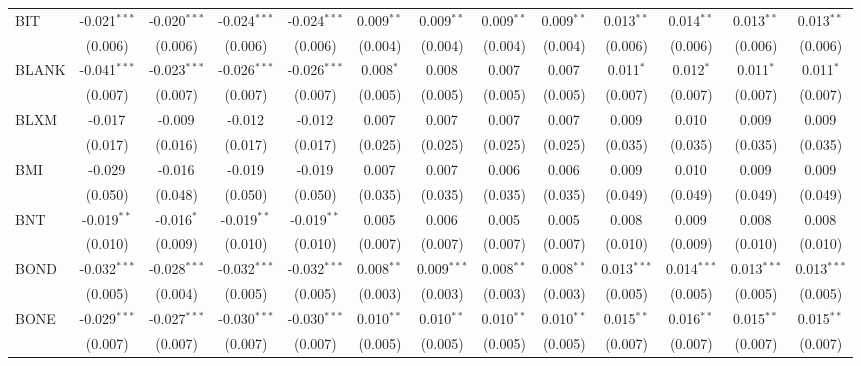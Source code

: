 \begin{table}[!htbp]
\begin{tabular}{@{\extracolsep{5pt}}lcccccccccccc}
 BIT & -0.021$^{***}$ & -0.020$^{***}$ & -0.024$^{***}$ & -0.024$^{***}$ & 0.009$^{**}$ & 0.009$^{**}$ & 0.009$^{**}$ & 0.009$^{**}$ & 0.013$^{**}$ & 0.014$^{**}$ & 0.013$^{**}$ & 0.013$^{**}$ \\
  & (0.006) & (0.006) & (0.006) & (0.006) & (0.004) & (0.004) & (0.004) & (0.004) & (0.006) & (0.006) & (0.006) & (0.006) \\
 BLANK & -0.041$^{***}$ & -0.023$^{***}$ & -0.026$^{***}$ & -0.026$^{***}$ & 0.008$^{*}$ & 0.008$^{}$ & 0.007$^{}$ & 0.007$^{}$ & 0.011$^{*}$ & 0.012$^{*}$ & 0.011$^{*}$ & 0.011$^{*}$ \\
  & (0.007) & (0.007) & (0.007) & (0.007) & (0.005) & (0.005) & (0.005) & (0.005) & (0.007) & (0.007) & (0.007) & (0.007) \\
 BLXM & -0.017$^{}$ & -0.009$^{}$ & -0.012$^{}$ & -0.012$^{}$ & 0.007$^{}$ & 0.007$^{}$ & 0.007$^{}$ & 0.007$^{}$ & 0.009$^{}$ & 0.010$^{}$ & 0.009$^{}$ & 0.009$^{}$ \\
  & (0.017) & (0.016) & (0.017) & (0.017) & (0.025) & (0.025) & (0.025) & (0.025) & (0.035) & (0.035) & (0.035) & (0.035) \\
 BMI & -0.029$^{}$ & -0.016$^{}$ & -0.019$^{}$ & -0.019$^{}$ & 0.007$^{}$ & 0.007$^{}$ & 0.006$^{}$ & 0.006$^{}$ & 0.009$^{}$ & 0.010$^{}$ & 0.009$^{}$ & 0.009$^{}$ \\
  & (0.050) & (0.048) & (0.050) & (0.050) & (0.035) & (0.035) & (0.035) & (0.035) & (0.049) & (0.049) & (0.049) & (0.049) \\
 BNT & -0.019$^{**}$ & -0.016$^{*}$ & -0.019$^{**}$ & -0.019$^{**}$ & 0.005$^{}$ & 0.006$^{}$ & 0.005$^{}$ & 0.005$^{}$ & 0.008$^{}$ & 0.009$^{}$ & 0.008$^{}$ & 0.008$^{}$ \\
  & (0.010) & (0.009) & (0.010) & (0.010) & (0.007) & (0.007) & (0.007) & (0.007) & (0.010) & (0.009) & (0.010) & (0.010) \\
 BOND & -0.032$^{***}$ & -0.028$^{***}$ & -0.032$^{***}$ & -0.032$^{***}$ & 0.008$^{**}$ & 0.009$^{***}$ & 0.008$^{**}$ & 0.008$^{**}$ & 0.013$^{***}$ & 0.014$^{***}$ & 0.013$^{***}$ & 0.013$^{***}$ \\
  & (0.005) & (0.004) & (0.005) & (0.005) & (0.003) & (0.003) & (0.003) & (0.003) & (0.005) & (0.005) & (0.005) & (0.005) \\
 BONE & -0.029$^{***}$ & -0.027$^{***}$ & -0.030$^{***}$ & -0.030$^{***}$ & 0.010$^{**}$ & 0.010$^{**}$ & 0.010$^{**}$ & 0.010$^{**}$ & 0.015$^{**}$ & 0.016$^{**}$ & 0.015$^{**}$ & 0.015$^{**}$ \\
  & (0.007) & (0.007) & (0.007) & (0.007) & (0.005) & (0.005) & (0.005) & (0.005) & (0.007) & (0.007) & (0.007) & (0.007) \\

\end{tabular}
\end{table}
